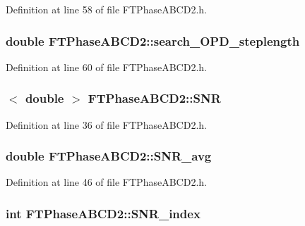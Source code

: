 Definition at line 58 of file FTPhaseABCD2.h.

\hypertarget{classFTPhaseABCD2_a24fa4eafbdca00c095adb33dee3eaa4b}{
\subsubsection[{search\_\-OPD\_\-steplength}]{\setlength{\rightskip}{0pt plus 5cm}double {\bf FTPhaseABCD2::search\_\-OPD\_\-steplength}}}
\label{classFTPhaseABCD2_a24fa4eafbdca00c095adb33dee3eaa4b}


Definition at line 60 of file FTPhaseABCD2.h.

\hypertarget{classFTPhaseABCD2_a38653f47e520c8a1ea7c3eee88b300c8}{
\subsubsection[{SNR}]{$<$ double $>$ {\bf FTPhaseABCD2::SNR}}}
\label{classFTPhaseABCD2_a38653f47e520c8a1ea7c3eee88b300c8}


Definition at line 36 of file FTPhaseABCD2.h.

\hypertarget{classFTPhaseABCD2_afb90442f695d6cf1dc5b09ea14ef8c5e}{
\subsubsection[{SNR\_\-avg}]{\setlength{\rightskip}{0pt plus 5cm}double {\bf FTPhaseABCD2::SNR\_\-avg}}}
\label{classFTPhaseABCD2_afb90442f695d6cf1dc5b09ea14ef8c5e}


Definition at line 46 of file FTPhaseABCD2.h.

\hypertarget{classFTPhaseABCD2_aa9157905b1eb76f63e4fc0ef853af13b}{
\subsubsection[{SNR\_\-index}]{\setlength{\rightskip}{0pt plus 5cm}int {\bf FTPhaseABCD2::SNR\_\-index}}}
\label{classFTPhaseABCD2_aa9157905b1eb76f63e4fc0ef853af13b}


